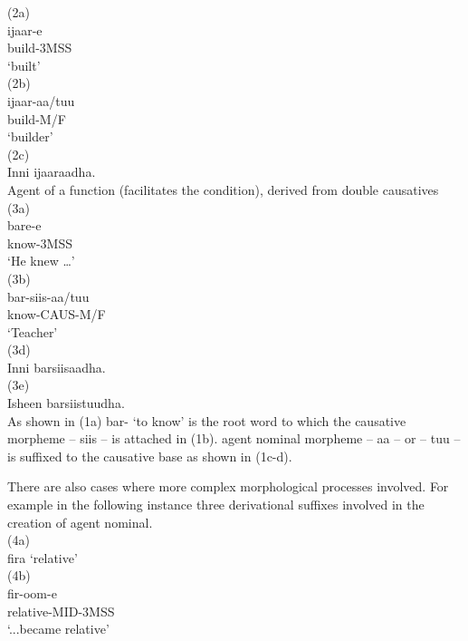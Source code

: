 \documentclass[11pt,a4paper]{article}
\begin{document}
(2a) 	\\
\indent ijaar-e\\
\indent build-3MSS\\
\indent ‘built’\\

(2b) \\	
\indent ijaar-aa/tuu\\
\indent build-M/F\\
\indent ‘builder’\\

(2c) \\
\indent *Inni ijaaraadha.\\


Agent of a function (facilitates the condition), derived from double causatives\\

(3a)\\
\indent	bare-e\\
\indent know-3MSS\\
\indent ‘He knew …’\\

(3b)	\\
\indent bar-siis-aa/tuu\\
\indent know-CAUS-M/F\\
\indent ‘Teacher’\\

(3d) \\
\indent	Inni barsiisaadha. \\

(3e)	\\
\indent	Isheen barsiistuudha.\\

As shown in (1a) bar- ‘to know’ is the root word to which the causative morpheme – siis – is attached in (1b). agent nominal morpheme – aa – or – tuu – is suffixed to the causative base as shown in (1c-d). 

There are also cases where more complex morphological processes involved. For example in the following instance three derivational suffixes involved in the creation of agent nominal.\\

(4a) 	\\
\indent fira ‘relative’\\

(4b) 	\\
\indent fir-oom-e\\
\indent relative-MID-3MSS\\
\indent ‘...became relative’\\
\end{document}
